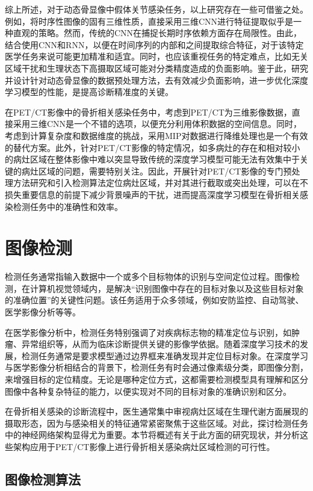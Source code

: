 综上所述，对于动态骨显像中假体关节感染任务，以上研究存在一些可借鉴之处。例如，将时序性图像的固有三维性质，直接采用三维CNN进行特征提取似乎是一种直观的策略。然而，传统的CNN在捕捉长期时序依赖方面存在局限性。由此，结合使用CNN和RNN，以便在时间序列的内部和之间提取综合特征，对于该特定医学任务来说可能更加精准和适宜。同时，也应该重视任务的特定难点，比如无关区域干扰和生理状态下高摄取区域可能对分类精度造成的负面影响。鉴于此，研究并设计针对动态骨显像的数据预处理方法，去有效减少负面影响，进一步优化深度学习模型的性能，是提高诊断精准度的关键。

在PET/CT影像中的骨折相关感染任务中，考虑到PET/CT为三维影像数据，直接采用三维CNN是一个不错的选项，以便充分利用体积数据的空间信息。同时，考虑到计算复杂度和数据维度的挑战，采用MIP对数据进行降维处理也是一个有效的替代方案。此外，针对PET/CT影像的特定情况，如多病灶的存在和相对较小的病灶区域在整体影像中难以突显导致传统的深度学习模型可能无法有效集中于关键的病灶区域的问题，需要特别关注。因此，开展针对PET/CT影像的专门预处理方法研究和引入检测算法定位病灶区域，并对其进行截取或突出处理，可以在不损失重要信息的前提下减少背景噪声的干扰，进而提高深度学习模型在骨折相关感染检测任务中的准确性和效率。

\section{图像检测}

检测任务通常指输入数据中一个或多个目标物体的识别与空间定位过程。图像检测，在计算机视觉领域内，是解决“识别图像中存在的目标对象以及这些目标对象的准确位置”的关键性问题。该任务适用于众多领域，例如安防监控、自动驾驶、医学影像分析等等。

在医学影像分析中，检测任务特别强调了对疾病标志物的精准定位与识别，如肿瘤、异常组织等，从而为临床诊断提供关键的影像学依据。随着深度学习技术的发展，检测任务通常是要求模型通过边界框来准确发现并定位目标对象。在深度学习与医学影像分析相结合的背景下，检测任务有时会通过像素级分类，即图像分割，来增强目标的定位精度。无论是哪种定位方式，这都需要检测模型具有理解和区分图像中各种复杂特征的能力，以便实现对不同的目标对象的准确识别和区分。

在骨折相关感染的诊断流程中，医生通常集中审视病灶区域在生理代谢方面展现的摄取形态，因为与感染相关的特征通常紧密聚焦于这些区域。对此，探讨检测任务中的神经网络架构显得尤为重要。本节将概述有关于此方面的研究现状，并分析这些架构应用于PET/CT影像上进行骨折相关感染病灶区域检测的可行性。

\subsection{图像检测算法}

